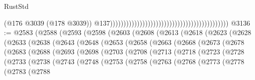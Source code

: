 \begin{lexlean}{RustStd}
\begin{coremodule}
                                                                                            (@176
                                                                                              @3039
                                                                                              (@178
                                                                                                @3039))
                                                                                            @137))))))))))))))))))))))))))))))))))))))))))))
@3136 := @2583
    (@2588
      (@2593
        (@2598
          (@2603
            (@2608
              (@2613
                (@2618
                  (@2623
                    (@2628
                      (@2633
                        (@2638
                          (@2643
                            (@2648
                              (@2653
                                (@2658
                                  (@2663
                                    (@2668
                                      (@2673
                                        (@2678
                                          (@2683
                                            (@2688
                                              (@2693
                                                (@2698
                                                  (@2703
                                                    (@2708
                                                      (@2713
                                                        (@2718
                                                          (@2723
                                                            (@2728
                                                              (@2733
                                                                (@2738
                                                                  (@2743
                                                                    (@2748
                                                                      (@2753
                                                                        (@2758
                                                                          (@2763
                                                                            (@2768
                                                                              (@2773
                                                                                (@2778
                                                                                  (@2783
                                                                                    (@2788

\end{coremodule}
\end{lexlean}

